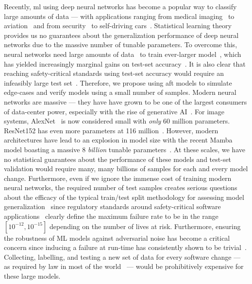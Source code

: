 \documentclass[sn-mathphys-num]{sn-jnl}%
\begin{document}
Recently, \acrfull{ml} using deep neural networks has become a popular way to classify large amounts of data --- with applications ranging from medical imaging~\cite{ai_medical_imaging} to aviation~\cite{ai_aviation} and from security~\cite{ai_security,ai_luggage,ai_prison} to self-driving cars~\cite{ai_automotive}.
Statistical learning theory~\cite{vcdimension,shalev2014understanding} provides us no guarantees about the generalization performance of deep neural networks due to the massive number of tunable parameters.
To overcome this, neural networks need large amounts of data~\cite{desislavov2021compute,bailly2022effects} to train ever-larger model~\cite{desislavov2021compute}, which has yielded increasingly marginal gains on test-set accuracy~\cite{sun2017revisiting}.
It is also clear that reaching safety-critical standards using test-set accuracy would require an infeasibly large test set~\cite{meyers}.
Therefore, we propose using \acrfull{aft} models to simulate edge-cases and verify models using a small number of samples.
Modern neural networks are massive --- they have have grown to be one of the largest consumers of data-center power, especially with the rise of generative AI~\cite{msft_water}.
For image systems, AlexNet~\cite{alom2018history} is now considered small with \textit{only} 60 million parameters.
ResNet152 has even more parameters at 116 million~\cite{resnet}.
However, modern architectures have lead to an explosion in model size with the recent Mamba model boasting a massive 8 \textit{billion} tunable parameters~\cite{mamba}. At these scales, we have no statistical guarantees about the performance of these models and test-set validation would require many, many billions of samples for each and every model change.
Furthermore, even if we ignore the immense cost of training modern neural networks, the required number of test samples creates serious questions about the efficacy of the typical train/test split methodology for assessing model generalization~\cite{meyers} since regulatory standards around safety-critical software applications~\cite{IEC61508,iso26262,aviation_software,safetyframework} clearly define the maximum failure rate to be in the range $[10^{-12}, 10^{-15}]$ depending on the number of lives at risk.
Furthermore, ensuring the robustness of ML models against adversarial noise has become a critical concern since inducing a failure at run-time has consistently shown to be trivial~\cite{adversarialpatch,carlini_towards_2017,croce_reliable_2020,hopskipjump,chakraborty2018adversarial,art2018}. Collecting, labelling, and testing a new set of data for every software change --- as required by law in most of the world~\cite{IEC61508,iso26262,aviation_software,safetyframework} --- would be prohibitively expensive for these large models.
\end{document}
